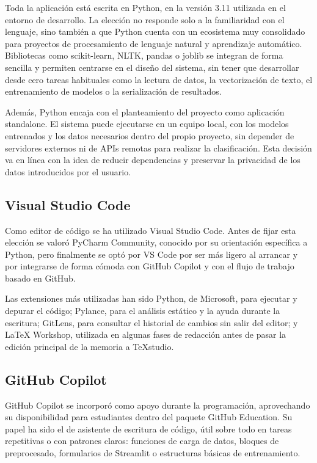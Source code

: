 Toda la aplicación está escrita en Python, en la versión 3.11 utilizada en el entorno de desarrollo. La elección no responde solo a la familiaridad con el lenguaje, sino también a que Python cuenta con un ecosistema muy consolidado para proyectos de procesamiento de lenguaje natural y aprendizaje automático. Bibliotecas como scikit-learn, NLTK, pandas o joblib se integran de forma sencilla y permiten centrarse en el diseño del sistema, sin tener que desarrollar desde cero tareas habituales como la lectura de datos, la vectorización de texto, el entrenamiento de modelos o la serialización de resultados.

Además, Python encaja con el planteamiento del proyecto como aplicación \gls{standalone}. El sistema puede ejecutarse en un equipo local, con los modelos entrenados y los datos necesarios dentro del propio proyecto, sin depender de servidores externos ni de APIs remotas para realizar la clasificación. Esta decisión va en línea con la idea de reducir dependencias y preservar la privacidad de los datos introducidos por el usuario.

\subsection{Visual Studio Code}

Como editor de código se ha utilizado Visual Studio Code. Antes de fijar esta elección se valoró PyCharm Community, conocido por su orientación específica a Python, pero finalmente se optó por VS Code por ser más ligero al arrancar y por integrarse de forma cómoda con GitHub Copilot y con el flujo de trabajo basado en GitHub.

Las extensiones más utilizadas han sido Python, de Microsoft, para ejecutar y depurar el código; Pylance, para el análisis estático y la ayuda durante la escritura; GitLens, para consultar el historial de cambios sin salir del editor; y LaTeX Workshop, utilizada en algunas fases de redacción antes de pasar la edición principal de la memoria a TeXstudio.

\subsection{GitHub Copilot}

GitHub Copilot se incorporó como apoyo durante la programación, aprovechando su disponibilidad para estudiantes dentro del paquete GitHub Education. Su papel ha sido el de asistente de escritura de código, útil sobre todo en tareas repetitivas o con patrones claros: funciones de carga de datos, bloques de preprocesado, formularios de Streamlit o estructuras básicas de entrenamiento.


